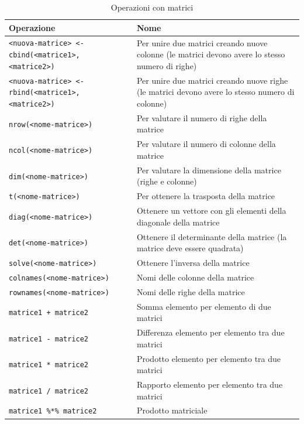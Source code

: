 \documentclass[
]{book}
\begin{document}
\begin{table}[!h]

\caption{\label{tab:table-matrix-operators}Operazioni con matrici}
\centering
\begin{tabular}[t]{l|l}
\hline
Operazione & Nome\\
\hline
\texttt{<nuova-matrice> <- cbind(<matrice1>, <matrice2>)} & Per unire due matrici creando nuove colonne (le matrici devono avere lo stesso numero di righe)\\
\hline
\texttt{<nuova-matrice> <- rbind(<matrice1>, <matrice2>)} & Per unire due matrici creando nuove righe (le matrici devono avere lo stesso numero di colonne)\\
\hline
\texttt{nrow(<nome-matrice>)} & Per valutare il numero di righe della matrice\\
\hline
\texttt{ncol(<nome-matrice>)} & Per valutare il numero di colonne della matrice\\
\hline
\texttt{dim(<nome-matrice>)} & Per valutare la dimensione della matrice (righe e colonne)\\
\hline
\texttt{t(<nome-matrice>)} & Per ottenere la trasposta della matrice\\
\hline
\texttt{diag(<nome-matrice>)} & Ottenere un vettore con gli elementi della diagonale della matrice\\
\hline
\texttt{det(<nome-matrice>)} & Ottenere il determinante della matrice (la matrice deve essere quadrata)\\
\hline
\texttt{solve(<nome-matrice>)} & Ottenere l'inversa della matrice\\
\hline
\texttt{colnames(<nome-matrice>)} & Nomi delle colonne della matrice\\
\hline
\texttt{rownames(<nome-matrice>)} & Nomi delle righe della matrice\\
\hline
\texttt{matrice1 + matrice2} & Somma elemento per elemento di due matrici\\
\hline
\texttt{matrice1 - matrice2} & Differenza elemento per elemento tra due matrici\\
\hline
\texttt{matrice1 * matrice2} & Prodotto elemento per elemento tra due matrici\\
\hline
\texttt{matrice1 / matrice2} & Rapporto elemento per elemento tra due matrici\\
\hline
\texttt{matrice1 \%*\% matrice2} & Prodotto matriciale\\
\hline
\end{tabular}
\end{table}
\end{document}
